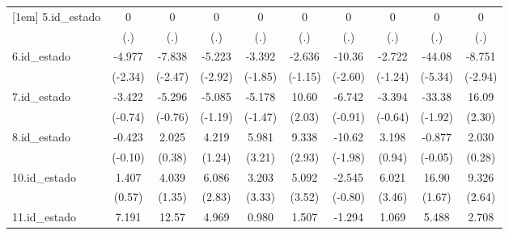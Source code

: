 {\begin{tabular}{l*{9}{c}}
[1em]
5.id\_estado &           0         &           0         &           0         &           0         &           0         &           0         &           0         &           0         &           0         \\
            &         (.)         &         (.)         &         (.)         &         (.)         &         (.)         &         (.)         &         (.)         &         (.)         &         (.)         \\
[1em]
6.id\_estado &      -4.977\sym{*}  &      -7.838\sym{*}  &      -5.223\sym{**} &      -3.392         &      -2.636         &      -10.36\sym{**} &      -2.722         &      -44.08\sym{***}&      -8.751\sym{**} \\
            &     (-2.34)         &     (-2.47)         &     (-2.92)         &     (-1.85)         &     (-1.15)         &     (-2.60)         &     (-1.24)         &     (-5.34)         &     (-2.94)         \\
[1em]
7.id\_estado &      -3.422         &      -5.296         &      -5.085         &      -5.178         &       10.60\sym{*}  &      -6.742         &      -3.394         &      -33.38         &       16.09\sym{*}  \\
            &     (-0.74)         &     (-0.76)         &     (-1.19)         &     (-1.47)         &      (2.03)         &     (-0.91)         &     (-0.64)         &     (-1.92)         &      (2.30)         \\
[1em]
8.id\_estado &      -0.423         &       2.025         &       4.219         &       5.981\sym{**} &       9.338\sym{**} &      -10.62\sym{*}  &       3.198         &      -0.877         &       2.030         \\
            &     (-0.10)         &      (0.38)         &      (1.24)         &      (3.21)         &      (2.93)         &     (-1.98)         &      (0.94)         &     (-0.05)         &      (0.28)         \\
[1em]
10.id\_estado&       1.407         &       4.039         &       6.086\sym{**} &       3.203\sym{***}&       5.092\sym{***}&      -2.545         &       6.021\sym{***}&       16.90         &       9.326\sym{**} \\
            &      (0.57)         &      (1.35)         &      (2.83)         &      (3.33)         &      (3.52)         &     (-0.80)         &      (3.46)         &      (1.67)         &      (2.64)         \\
[1em]
11.id\_estado&       7.191\sym{**} &       12.57\sym{***}&       4.969\sym{***}&       0.980         &       1.507         &      -1.294         &       1.069         &       5.488         &       2.708         \\

\end{tabular}}
